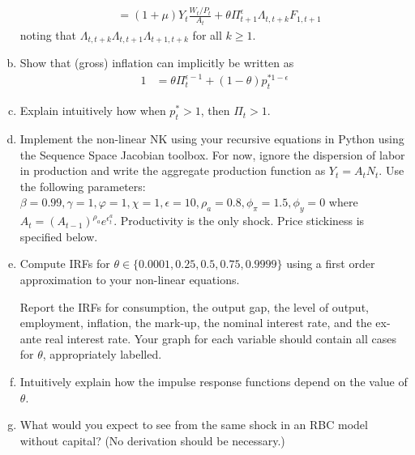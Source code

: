 \documentclass{article}
\newcommand{\1}{\mathbf{1}}
\begin{document}
\begin{enumerate}[(a)]
\begin{align*}
		&=(1+\mu)Y_t\frac{W_{t}/P_{t}}{A_{t}}+\theta\Pi_{t+1}^{\epsilon}\Lambda_{t,t+k}F_{1,t+1}
	\end{align*}
	noting that $\Lambda_{t,t+k}\Lambda_{t,t+1}\Lambda_{t+1,t+k}$ for all $k\ge 1$.
	\item Show that (gross) inflation can implicitly be written as
	\begin{align*}
		1&=\theta \Pi_{t}^{\epsilon-1} + (1-\theta) p_{t}^{*1-\epsilon}
	\end{align*}
	\item Explain intuitively how when $p_t^*>1$, then $\Pi_t>1$.
	\item Implement the non-linear NK using your recursive equations in Python using the Sequence Space Jacobian toolbox. For now, ignore the dispersion of labor in production and write the aggregate production function as $Y_t=A_tN_t$. Use the following parameters: $\beta=0.99,\gamma=1,\varphi=1,\chi=1,\epsilon=10,\rho_a=0.8,\phi_\pi=1.5,\phi_y=0$ where $A_t=(A_{t-1})^{\rho_a}e^{\epsilon_t^a}$. Productivity is the only shock. Price stickiness is specified below.
	\item Compute IRFs for $\theta\in\{0.0001,0.25,0.5,0.75,0.9999\}$ using a first order approximation to your non-linear equations.
	
	Report the IRFs for consumption, the output gap, the level of output, employment, inflation, the mark-up, the nominal interest rate, and the ex-ante real interest rate. Your graph for each variable should contain all cases for $\theta$, appropriately labelled. 
	\item Intuitively explain how the impulse response functions depend on the value of $\theta$.
	\item What would you expect to see from the same shock in an RBC model without capital? (No derivation should be necessary.)
\end{enumerate}
\end{document}
